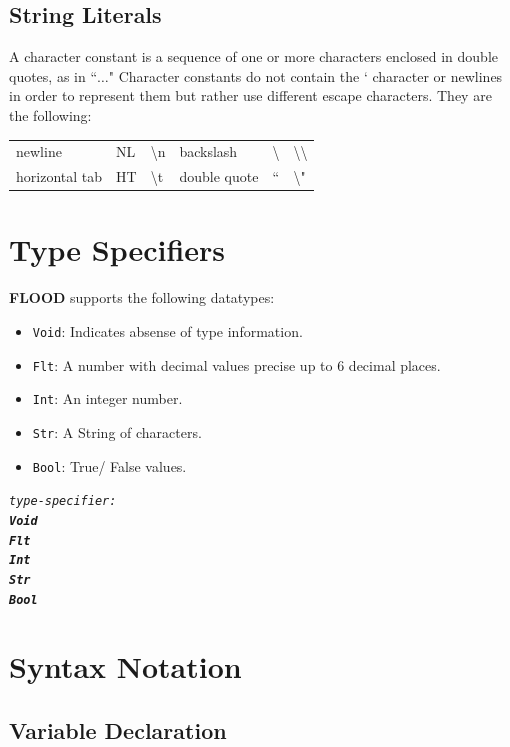 \documentclass[12pt]{report}
\begin{document}
\subsection{String Literals}

A character constant is a sequence of one or more characters enclosed in double quotes, as in ``$\ldots$" Character constants do not contain the ` character or newlines in order to represent them but rather use different escape characters. They are the following:

\begin{center}
\begin{tabular}{ l l l l l l }
newline & NL & \textbackslash{n} & backslash & \textbackslash & \textbackslash\textbackslash \\
horizontal tab & HT & \textbackslash{t} & double quote & `` & \textbackslash"
\end{tabular}
\end{center}

\section{Type Specifiers}

\textbf{FLOOD} supports the following datatypes:
\begin{itemize}
\item \texttt{Void}: Indicates absense of type information.
\item \texttt{Flt}: A number with decimal values precise up to 6 decimal places.
\item \texttt{Int}: An integer number.
\item \texttt{Str}: A String of characters.
\item \texttt{Bool}: True/ False values.
\end{itemize}
\begin{alltt}\begin{singlespace}
         \textit{type-specifier:}
              \textit{\textbf{Void}}
              \textit{\textbf{Flt}}
              \textit{\textbf{Int}}
              \textit{\textbf{Str}}
              \textit{\textbf{Bool}}\end{singlespace}
\end{alltt}

\section{Syntax Notation}

\subsection{Variable Declaration}
\end{document}
